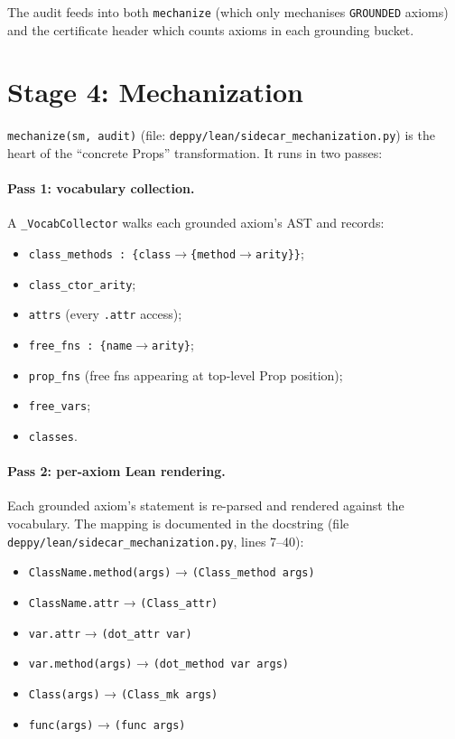 The audit feeds into both \texttt{mechanize} (which only
mechanises \texttt{GROUNDED} axioms) and the certificate header
which counts axioms in each grounding bucket.

\section{Stage 4: Mechanization}
\label{sec:mechanize}

\texttt{mechanize(sm, audit)} (file:
\texttt{deppy/lean/sidecar\_mechanization.py}) is the heart of the
``concrete Props'' transformation.  It runs in two passes:

\paragraph{Pass 1: vocabulary collection.}  A
\texttt{\_VocabCollector} walks each grounded axiom's AST and
records:
\begin{itemize}[leftmargin=1.7em]
  \item \texttt{class\_methods : \{class$\to$\{method$\to$arity\}\}};
  \item \texttt{class\_ctor\_arity};
  \item \texttt{attrs} (every \texttt{.attr} access);
  \item \texttt{free\_fns : \{name$\to$arity\}};
  \item \texttt{prop\_fns} (free fns appearing at top-level
    Prop position);
  \item \texttt{free\_vars};
  \item \texttt{classes}.
\end{itemize}

\paragraph{Pass 2: per-axiom Lean rendering.}  Each grounded axiom's
statement is re-parsed and rendered against the vocabulary.  The
mapping is documented in the docstring (file
\texttt{deppy/lean/sidecar\_mechanization.py}, lines 7--40):

\begin{itemize}[leftmargin=1.7em]
  \item \texttt{ClassName.method(args)} → \texttt{(Class\_method args)}
  \item \texttt{ClassName.attr} → \texttt{(Class\_attr)}
  \item \texttt{var.attr} → \texttt{(dot\_attr var)}
  \item \texttt{var.method(args)} → \texttt{(dot\_method var args)}
  \item \texttt{Class(args)} → \texttt{(Class\_mk args)}
  \item \texttt{func(args)} → \texttt{(func args)}
\end{itemize}

